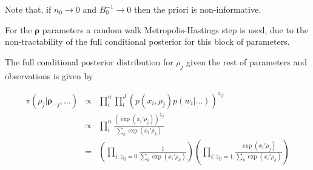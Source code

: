 \documentclass[11pt,letterpaper]{article}
\begin{document}
Note that, if $n_0\rightarrow 0$ and $B_0^{-1} \rightarrow 0$ then the priori is non-informative.

For the $\mathbf \rho$ parameters a random walk Metropolis-Hastings step is used, due to the non-tractability of the full conditional posterior for this block of parameters.

The full conditional posterior distribution for $\rho_j$ given the rest of parameters and observations is given by

\begin{eqnarray*}
    \pi (\rho_j| \mathbf \rho_{-j} , \ldots ) &\propto& \prod_i^n \prod_l^J (p(x_i, \rho_j) p(w_i | \dots))^{z_{ij}} \\
    &\propto& \prod_i^n \frac{(\exp(x_i' \rho_j))^{z_{ij}}}{\sum_k \exp(x_i' \rho_k)} \\
    &=& \left(  \prod_{i: z_{ij}=0} \frac{1}{\sum_k \exp(x_i' \rho_k)} \right) \left( \prod_{i: z_{ij}=1} \frac{\exp(x_i' \rho_j)}{\sum_k \exp(x_i' \rho_k)} \right)
\end{eqnarray*}
\end{document}
